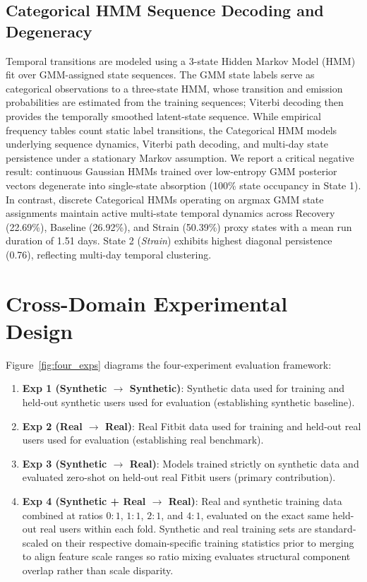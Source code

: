 \documentclass[conference]{IEEEtran}
\begin{document}
\subsection{Categorical HMM Sequence Decoding and Degeneracy}
Temporal transitions are modeled using a 3-state Hidden Markov Model (HMM) fit over GMM-assigned state sequences. The GMM state labels serve as categorical observations to a three-state HMM, whose transition and emission probabilities are estimated from the training sequences; Viterbi decoding then provides the temporally smoothed latent-state sequence. While empirical frequency tables count static label transitions, the Categorical HMM models underlying sequence dynamics, Viterbi path decoding, and multi-day state persistence under a stationary Markov assumption. We report a critical negative result: continuous Gaussian HMMs trained over low-entropy GMM posterior vectors degenerate into single-state absorption (100\% state occupancy in State 1). In contrast, discrete Categorical HMMs operating on argmax GMM state assignments maintain active multi-state temporal dynamics across Recovery (22.69\%), Baseline (26.92\%), and Strain (50.39\%) proxy states with a mean run duration of 1.51 days. State 2 (\textit{Strain}) exhibits highest diagonal persistence (0.76), reflecting multi-day temporal clustering.

\section{Cross-Domain Experimental Design}
Figure~\ref{fig:four_exps} diagrams the four-experiment evaluation framework:
\begin{enumerate}
    \item \textbf{Exp 1 (Synthetic $\rightarrow$ Synthetic)}: Synthetic data used for training and held-out synthetic users used for evaluation (establishing synthetic baseline).
    \item \textbf{Exp 2 (Real $\rightarrow$ Real)}: Real Fitbit data used for training and held-out real users used for evaluation (establishing real benchmark).
    \item \textbf{Exp 3 (Synthetic $\rightarrow$ Real)}: Models trained strictly on synthetic data and evaluated zero-shot on held-out real Fitbit users (primary contribution).
    \item \textbf{Exp 4 (Synthetic + Real $\rightarrow$ Real)}: Real and synthetic training data combined at ratios $0:1$, $1:1$, $2:1$, and $4:1$, evaluated on the exact same held-out real users within each fold. Synthetic and real training sets are standard-scaled on their respective domain-specific training statistics prior to merging to align feature scale ranges so ratio mixing evaluates structural component overlap rather than scale disparity.
\end{enumerate}
\end{document}
